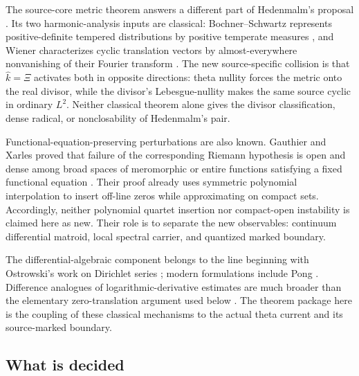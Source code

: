 \documentclass[11pt]{article}
\theoremstyle{definition}
\theoremstyle{remark}
\begin{document}
The source-core metric theorem answers a different part of Hedenmalm's
proposal \cite{Hedenmalm2026}.  Its two harmonic-analysis inputs are
classical: Bochner--Schwartz represents positive-definite tempered
distributions by positive temperate measures
\cite{Schwartz1966}, and Wiener characterizes cyclic translation
vectors by almost-everywhere nonvanishing of their Fourier transform
\cite{Wiener1932}.  The new source-specific collision is that
\(\widehat k=\Xi\) activates both in opposite directions: theta nullity
forces the metric onto the real divisor, while the divisor's
Lebesgue-nullity makes the same source cyclic in ordinary \(L^2\).
Neither classical theorem alone gives the divisor classification,
dense radical, or nonclosability of Hedenmalm's pair.

Functional-equation-preserving perturbations are also known.
Gauthier and Xarles proved that failure of the corresponding Riemann
hypothesis is open and dense among broad spaces of meromorphic or entire
functions satisfying a fixed functional equation
\cite{GauthierXarles2009}.  Their proof already uses symmetric polynomial
interpolation to insert off-line zeros while approximating on compact
sets.  Accordingly, neither polynomial quartet insertion nor
compact-open instability is claimed here as new.  Their role is to
separate the new observables: continuum differential matroid, local
spectral carrier, and quantized marked boundary.

The differential-algebraic component belongs to the line beginning with
Ostrowski's work on Dirichlet series
\cite{Ostrowski1920,HansenStoneWolfson2022}; modern formulations include
Pong \cite{Pong2016}.  Difference analogues of logarithmic-derivative
estimates are much broader than the elementary zero-translation
argument used below \cite{HalburdKorhonen2006,ChiangFeng2009}.
The theorem package here is the coupling of these classical mechanisms
to the actual theta current and its source-marked boundary.

\subsection{What is decided}
\end{document}
